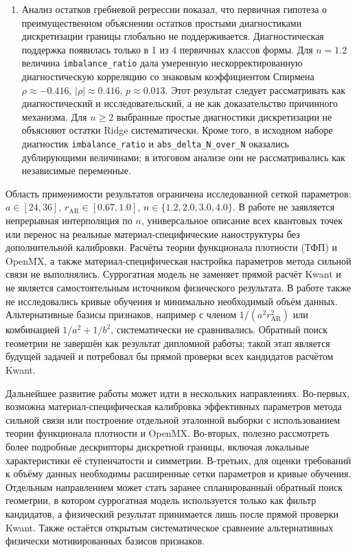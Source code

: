 \begin{enumerate}
  \item Анализ остатков гребневой регрессии показал, что первичная гипотеза о
  преимущественном объяснении остатков простыми диагностиками дискретизации границы
  глобально не поддерживается. Диагностическая поддержка появилась только в 1 из 4
  первичных классов формы. Для $n=1.2$ величина \texttt{imbalance\_ratio} дала умеренную
  нескорректированную диагностическую корреляцию со знаковым коэффициентом Спирмена
  $\rho\approx -0.416$, $|\rho|\approx 0.416$, $p\approx 0.013$. Этот результат следует
  рассматривать как диагностический и исследовательский, а не как доказательство
  причинного механизма. Для $n\geq 2$ выбранные простые диагностики дискретизации не
  объясняют остатки Ridge систематически. Кроме того, в исходном наборе диагностик
  \texttt{imbalance\_ratio} и \texttt{abs\_delta\_N\_over\_N} оказались дублирующими
  величинами; в итоговом анализе они не рассматривались как независимые переменные.
\end{enumerate}

Область применимости результатов ограничена исследованной сеткой параметров: $a \in
[24,36]$, $r_{\mathrm{AR}} \in [0.67,1.0]$, $n \in \{1.2,2.0,3.0,4.0\}$. В работе не
заявляется непрерывная интерполяция по $n$, универсальное описание всех квантовых точек
или перенос на реальные материал-специфические наноструктуры без дополнительной
калибровки. Расчёты теории функционала плотности (ТФП) и OpenMX, а также
материал-специфическая настройка параметров метода сильной связи не выполнялись.
Суррогатная модель не заменяет прямой расчёт Kwant и не является самостоятельным
источником физического результата. В работе также не исследовались кривые обучения и
минимально необходимый объём данных. Альтернативные базисы признаков, например с членом
$1/(a^2 r_{\mathrm{AR}}^2)$ или комбинацией $1/a^2+1/b^2$, систематически не сравнивались.
Обратный поиск геометрии не завершён как результат дипломной работы; такой этап является
будущей задачей и потребовал бы прямой проверки всех кандидатов расчётом Kwant.

Дальнейшее развитие работы может идти в нескольких направлениях. Во-первых, возможна
материал-специфическая калибровка эффективных параметров метода сильной связи или
построение отдельной эталонной выборки с использованием теории функционала плотности и
OpenMX. Во-вторых, полезно рассмотреть более подробные дескрипторы дискретной границы,
включая локальные характеристики её ступенчатости и симметрии. В-третьих, для оценки
требований к объёму данных необходимы расширенные сетки параметров и кривые обучения.
Отдельным направлением может стать заранее спланированный обратный поиск геометрии, в
котором суррогатная модель используется только как фильтр кандидатов, а физический
результат принимается лишь после прямой проверки Kwant. Также остаётся открытым
систематическое сравнение альтернативных физически мотивированных базисов признаков.

